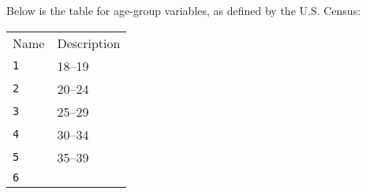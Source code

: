 \documentclass[]{article}
\begin{document}
Below is the table for age-group variables, as defined by the U.S.
Census:

\begin{longtable}[c]{@{}ll@{}}
\toprule\addlinespace
\begin{minipage}[b]{0.24\columnwidth}\raggedright
Name
\end{minipage} & \begin{minipage}[b]{0.69\columnwidth}\raggedright
Description
\end{minipage}
\\\addlinespace
\midrule\endhead
\begin{minipage}[t]{0.24\columnwidth}\raggedright
\texttt{1}
\end{minipage} & \begin{minipage}[t]{0.69\columnwidth}\raggedright
18--19
\end{minipage}
\\\addlinespace
\begin{minipage}[t]{0.24\columnwidth}\raggedright
\texttt{2}
\end{minipage} & \begin{minipage}[t]{0.69\columnwidth}\raggedright
20--24
\end{minipage}
\\\addlinespace
\begin{minipage}[t]{0.24\columnwidth}\raggedright
\texttt{3}
\end{minipage} & \begin{minipage}[t]{0.69\columnwidth}\raggedright
25--29
\end{minipage}
\\\addlinespace
\begin{minipage}[t]{0.24\columnwidth}\raggedright
\texttt{4}
\end{minipage} & \begin{minipage}[t]{0.69\columnwidth}\raggedright
30--34
\end{minipage}
\\\addlinespace
\begin{minipage}[t]{0.24\columnwidth}\raggedright
\texttt{5}
\end{minipage} & \begin{minipage}[t]{0.69\columnwidth}\raggedright
35--39
\end{minipage}
\\\addlinespace
\begin{minipage}[t]{0.24\columnwidth}\raggedright
\texttt{6}
\end{minipage} & \begin{minipage}[t]{0.69\columnwidth}\raggedright

\end{minipage}
\end{longtable}
\end{document}
